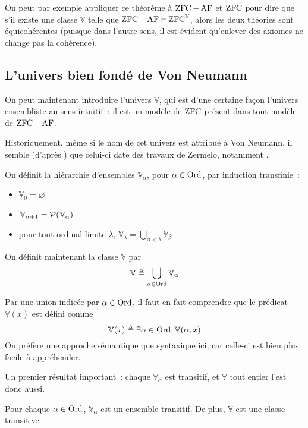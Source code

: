 On peut par exemple appliquer ce théorème à $\operatorname{ZFC} - \operatorname{AF}$ et $\operatorname{ZFC}$ pour dire
que s'il existe une classe $\mathbb V$ telle que
$\operatorname{ZFC} - \operatorname{AF}\vdash \operatorname{ZFC}^\mathbb V$, alors les deux théories sont équicohérentes
(puisque dans l'autre sens, il est évident qu'enlever des axiomes ne change pas
la cohérence).

\subsection{L'univers bien fondé de Von Neumann}

On peut maintenant introduire l'univers $\mathbb V$, qui est d'une certaine
façon l'univers ensembliste au sens intuitif~: il est un modèle de $\operatorname{ZFC}$
présent dans tout modèle de $\operatorname{ZFC} - \operatorname{AF}$.

Historiquement, même si le nom de cet univers est attribué à Von Neumann,
il semble (d'après \cite{moore2012zermelo}) que celui-ci date des travaux de 
Zermelo, notamment \cite{Zermelo1930}.

\begin{definition}
  On définit la hiérarchie d'ensembles $\mathbb V_{\alpha}$, pour
  $\alpha \in \operatorname{Ord}$, par induction transfinie~:
  \begin{itemize}
  \item $\mathbb V_0 = \varnothing$.
  \item $\mathbb V_{\alpha + 1} = \mathcal{P}(\mathbb V_{\alpha})$
  \item pour tout ordinal limite $\lambda$,
    $\displaystyle\mathbb V_\lambda = \bigcup_{\beta < \lambda}\mathbb V_\beta$
  \end{itemize}

  On définit maintenant la classe $\mathbb V$ par
  \[\mathbb V \triangleq \bigcup_{\alpha \in \operatorname{Ord}} \mathbb V_\alpha\]
\end{definition}

\begin{remark}
  Par une union indicée par $\alpha \in \operatorname{Ord}$, il faut en fait comprendre que le
  prédicat $\mathbb V(x)$ est défini comme
  \[\mathbb V(x) \triangleq \exists \alpha \in \operatorname{Ord}, \mathbb V(\alpha,x)\]
  On préfère une approche sémantique que syntaxique ici, car celle-ci est bien
  plus facile à appréhender.
\end{remark}

Un premier résultat important~: chaque $\mathbb V_\alpha$ est transitif, et
$\mathbb V$ tout entier l'est donc aussi.

\begin{property}
  Pour chaque $\alpha\in\operatorname{Ord}$, $\mathbb V_\alpha$ est un ensemble transitif. De
  plus, $\mathbb V$ est une classe transitive.
\end{property}


